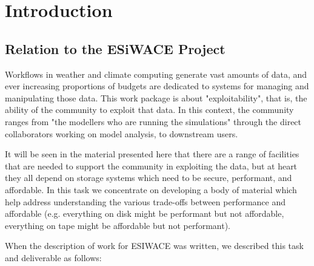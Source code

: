 \documentclass{../../template/esiwace-report}
\begin{document}
\chapter{Introduction}
\label{sec:introduction}


\section{Relation to the ESiWACE Project}

Workflows in weather and climate computing generate vast amounts of data, and ever increasing proportions of budgets are dedicated to systems for managing and manipulating those data. This work package is about "exploitability", that is, the ability of the community to exploit that data.  In this context, the community ranges from "the modellers who are running the simulations" through the direct collaborators working on model analysis, to downstream users.

It will be seen in the material presented here that there are a range of facilities that are needed to support the community in exploiting the data, but at heart they all depend on storage systems which need to be secure, performant, and affordable. In this task we concentrate on developing a body of material which help address understanding the various trade-offs between performance and affordable (e.g. everything on disk might be performant but not affordable, everything on tape might be affordable but not performant).

When the description of work for ESIWACE was written, we described this task and deliverable as follows:
\end{document}
